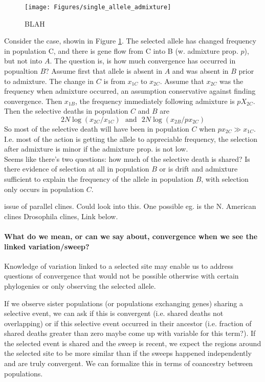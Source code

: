 \documentclass[a4paper,10pt]{article}
\newcommand{\kl}[1]{{\color{orange} #1}}
\begin{document}
\begin{figure}
	\texttt{[image: Figures/single\_allele\_admixture]}
	\caption{BLAH}
	\label{fig:admix-graph}
\end{figure}
Consider the case, showin in Figure \ref{fig:admix-graph}. The selected allele has changed frequency in
population C, and there is gene flow from C into B (w. admixture
prop. $p$), but not into $A$. The question is, is how much convergence
has occurred in popualtion $B$?  
Assume first that allele is absent in
$A$ and was absent in $B$ prior to admixture.  The change in $C$ is
from $x_{1C}$ to $x_{2C}$. Assume that
$x_{2C}$ was the frequency when admixture occurred, an assumption conservative
against finding convergence. Then $x_{1B}$, the frequency immediately
following admixture is $pX_{2C}$. Then the selective deaths in
population $C$ and $B$ are
\begin{equation} 
2N\log(x_{2C}/x_{1C})~~~\textrm{and}~~~2N\log(x_{2B}/px_{2C})
\end{equation}
So most of the selective death will have been in population $C$ when
$px_{2C} \gg x_{1C}$. I.e. most of the action is getting the allele to
appreciable frequency, the selection after admixture is minor if the
admixture prop. is not low.\\ 

Seems like there's two questions: how much of
the selective death is shared? Is there evidence of selection at all
in population $B$ or is drift and admixture sufficient to explain the
frequency of the allele in population $B$, with selection only occurs
in population $C$.

issue of parallel clines. Could look into this. One possible eg. is
the N. American clines Drosophila clines, Link below.


\paragraph{What do we mean, or can we say about, convergence when we see the linked variation/sweep?}
Knowledge of variation linked to a selected site may enable us to address questions of convergence that would not be possible otherwise with certain phylogenies or only observing the selected allele.

If we observe sister populations (or populations exchanging genes) sharing a selective event, we can ask if this is convergent (i.e. shared deaths not overlapping) or if this selective event occurred in their ancestor (i.e. fraction of shared deaths greater than zero \kl{maybe come up with variable for this term?}). If the selected event is shared and the sweep is recent, we expect the regions around the selected site to be more similar than if the sweeps happened independently and are truly convergent. We can formalize this in terms of coancestry between populations.
\end{document}
